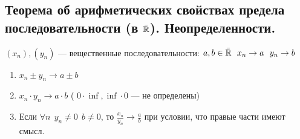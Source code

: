 \subsection{Теорема об арифметических свойствах предела последовательности  (в $\bar{\operatorname*{\mathbb{R}}}$). Неопределенности.}
\begin{theorem}
      $(x_n), (y_n)$ --- вещественные последовательности: $a, b \in \bar{\operatorname*{\mathbb{R}}} \ \ x_n \to a \ \ y_n \to b$
      
     \begin{enumerate}
         \item  $x_n \pm y_n \to a \pm b$
         \item $x_n \cdot y_n \to a \cdot b$ ( $0\cdot \inf, \inf \cdot 0$ --- не определены)
         \item Если $\forall n \ \ y_n \neq 0 \ \ b \neq 0$, то $\frac{x_n}{y_n} \to \frac{a}{b}$ при условии, что правые части имеют смысл.\\
     \end{enumerate}
\end{theorem}
    
\newpage
